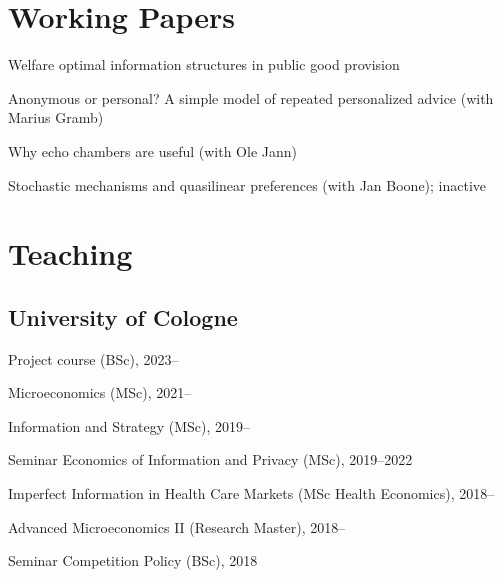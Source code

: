 \documentclass[a4paper]{article}
\renewenvironment{itemize}{
  \begin{list}{}{
    \setlength{\leftmargin}{1.5em}
  }
}{
  \end{list}
}
\begin{document}
\section*{Working Papers}

\begin{itemize}
\item Welfare optimal information structures in public good provision
  
\item Anonymous or personal? A simple model of repeated personalized advice (with Marius Gramb)
  
\item Why echo chambers are useful (with Ole Jann)
  
\item Stochastic mechanisms and quasilinear preferences (with Jan Boone); inactive

\end{itemize}




\section*{Teaching} 

\subsection*{University of Cologne}
\begin{itemize}
\item Project course (BSc), 2023--  
\item Microeconomics (MSc), 2021--
\item Information and Strategy (MSc), 2019--
\item Seminar Economics of Information and Privacy (MSc), 2019--2022
\item Imperfect Information in Health Care Markets (MSc Health Economics), 2018--
\item Advanced Microeconomics II (Research Master), 2018--
\item Seminar Competition Policy (BSc), 2018
\end{itemize}
\end{document}
